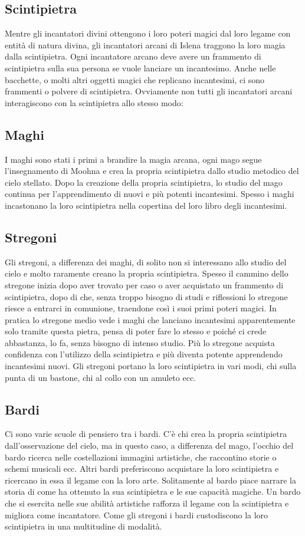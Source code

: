 \documentclass[10pt, a4paper]{report}
\begin{document}
\begin{multicols}{2}
\section{Scintipietra}
Mentre gli incantatori divini ottengono i loro poteri magici dal loro legame con entità di natura divina, gli incantatori arcani di Islena traggono la loro magia dalla scintipietra. Ogni incantatore arcano deve avere un frammento di scintipietra sulla sua persona se vuole lanciare un incantesimo. Anche nelle bacchette, o molti altri oggetti magici che replicano incantesimi, ci sono frammenti o polvere di scintipietra. Ovviamente non tutti gli incantatori arcani interagiscono con la scintipietra allo stesso modo:

\subsection*{Maghi}
I maghi sono stati i primi a brandire la magia arcana, ogni mago segue l'insegnamento di Moohna e crea la propria scintipietra dallo studio metodico del cielo stellato. Dopo la creazione della propria scintipietra, lo studio del mago continua per l'apprendimento di nuovi e più potenti incantesimi. Spesso i maghi incastonano la loro scintipietra nella copertina del loro libro degli incantesimi.
	
\subsection*{Stregoni}
Gli stregoni, a differenza dei maghi, di solito non si interessano allo studio del cielo e molto raramente creano la propria scintipietra. Spesso il cammino dello stregone inizia dopo aver trovato per caso o aver acquistato un frammento di scintipietra, dopo di che, senza troppo bisogno di studi e riflessioni lo stregone riesce a entrarci in comunione, traendone così i suoi primi poteri magici. In pratica lo stregone medio vede i maghi che lanciano incantesimi apparentemente solo tramite questa pietra, pensa di poter fare lo stesso e poiché ci crede abbastanza, lo fa, senza bisogno di intenso studio. Più lo stregone acquista confidenza con l'utilizzo della scintipietra e più diventa potente apprendendo incantesimi nuovi. Gli stregoni portano la loro scintipietra in vari modi, chi sulla punta di un bastone, chi al collo con un amuleto ecc. 


\subsection*{Bardi}
Ci sono varie scuole di pensiero tra i bardi. C'è chi crea la propria scintipietra dall'osservazione del cielo, ma in questo caso, a differenza del mago, l'occhio del bardo ricerca nelle costellazioni immagini artistiche, che raccontino storie o schemi musicali ecc. Altri bardi preferiscono acquistare la loro scintipietra e ricercano in essa il legame con la loro arte. Solitamente al bardo piace narrare la storia di come ha ottenuto la sua scintipietra e le sue capacità magiche. Un bardo che si esercita nelle sue abilità artistiche rafforza il legame con la scintipietra e migliora come incantatore.
Come gli stregoni i bardi custodiscono la loro scintipietra in una multitudine di modalità.  


\end{multicols}
\end{document}
